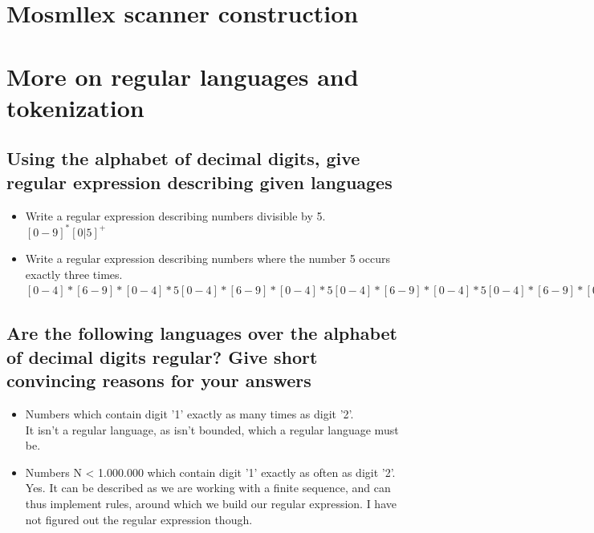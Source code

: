 \documentclass{article}
\begin{document}
\section{Mosmllex scanner construction}
\section{More on regular languages and tokenization}
\subsection{Using the alphabet of decimal digits, give regular expression describing given languages}
\begin{itemize}
\item Write a regular expression describing numbers divisible by 5.\\
\([0-9]^*[0|5]^+\)
\item Write a regular expression describing numbers where the number 5 occurs exactly three times.\\
\([0-4]*[6-9]*[0-4]*5[0-4]*[6-9]*[0-4]*5[0-4]*[6-9]*[0-4]*5[0-4]*[6-9]*[0-4]*\)
\end{itemize}
\subsection{Are the following languages over the alphabet of decimal digits regular? Give short convincing reasons for your answers}
\begin{itemize}
\item Numbers which contain digit '1' exactly as many times as digit '2'.\\
It isn't a regular language, as isn't bounded, which a regular language must be.
\item Numbers N < 1.000.000 which contain digit '1' exactly as often as digit '2'.\\
Yes. It can be described as we are working with a finite sequence, and can thus implement rules, around which we build our regular expression. I have not figured out the regular expression though.
\end{itemize}
\end{document}
